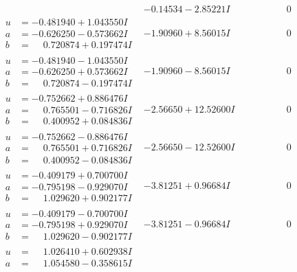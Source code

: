 \documentclass[1p]{elsarticle_modified}
\theoremstyle{definition}
\begin{document}
$$\begin{array}{c|c|c}
 & -0.14534 - 2.85221 I & \phantom{-0.000000 } 0 \\ \hline\begin{aligned}
u &= -0.481940 + 1.043550 I \\
a &= -0.626250 - 0.573662 I \\
b &= \phantom{-}0.720874 + 0.197474 I\end{aligned}
 & -1.90960 + 8.56015 I & \phantom{-0.000000 } 0 \\ \hline\begin{aligned}
u &= -0.481940 - 1.043550 I \\
a &= -0.626250 + 0.573662 I \\
b &= \phantom{-}0.720874 - 0.197474 I\end{aligned}
 & -1.90960 - 8.56015 I & \phantom{-0.000000 } 0 \\ \hline\begin{aligned}
u &= -0.752662 + 0.886476 I \\
a &= \phantom{-}0.765501 - 0.716826 I \\
b &= \phantom{-}0.400952 + 0.084836 I\end{aligned}
 & -2.56650 + 12.52600 I & \phantom{-0.000000 } 0 \\ \hline\begin{aligned}
u &= -0.752662 - 0.886476 I \\
a &= \phantom{-}0.765501 + 0.716826 I \\
b &= \phantom{-}0.400952 - 0.084836 I\end{aligned}
 & -2.56650 - 12.52600 I & \phantom{-0.000000 } 0 \\ \hline\begin{aligned}
u &= -0.409179 + 0.700700 I \\
a &= -0.795198 - 0.929070 I \\
b &= \phantom{-}1.029620 + 0.902177 I\end{aligned}
 & -3.81251 + 0.96684 I & \phantom{-0.000000 } 0 \\ \hline\begin{aligned}
u &= -0.409179 - 0.700700 I \\
a &= -0.795198 + 0.929070 I \\
b &= \phantom{-}1.029620 - 0.902177 I\end{aligned}
 & -3.81251 - 0.96684 I & \phantom{-0.000000 } 0 \\ \hline\begin{aligned}
u &= \phantom{-}1.026410 + 0.602938 I \\
a &= \phantom{-}1.054580 - 0.358615 I \\

\end{aligned}
\end{array}$$
\end{document}
